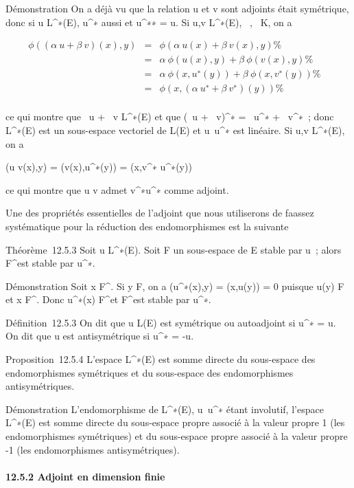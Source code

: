 \documentclass[]{article}
\begin{document}
Démonstration On a déjà vu que la relation u et v sont adjoints était
symétrique, donc si u \in L^∗(E), u^∗ aussi et
u^∗∗ = u. Si u,v \in L^∗(E), \alpha~,\beta~ \in K, on a

\begin{align*} \phi((\alpha~u + \beta~v)(x),y)& =& \phi(\alpha~u(x) +
\beta~v(x),y) \%& \\ & =& \alpha~\phi(u(x),y) +
\beta~\phi(v(x),y) \%& \\ & =&
\alpha~\phi(x,u^∗(y)) + \beta~\phi(x,v^∗(y))\%&
\\ & =& \phi(x,(\alpha~u^∗ +
\beta~v^∗)(y)) \%& \\
\end{align*}

ce qui montre que \alpha~u + \beta~v \in L^∗(E) et que (\alpha~u +
\beta~v)^∗ = \alpha~u^∗ + \beta~v^∗~; donc
L^∗(E) est un sous-espace vectoriel de L(E) et
u\mapsto~u^∗ est linéaire. Si u,v \in
L^∗(E), on a

\phi(u \cdot v(x),y) = \phi(v(x),u^∗(y)) = \phi(x,v^∗\cdot
u^∗(y))

ce qui montre que u \cdot v admet v^∗\cdot u^∗ comme
adjoint.

Une des propriétés essentielles de l'adjoint que nous utiliserons de
fa\ccon assez systématique pour la réduction des
endomorphismes est la suivante

Théorème~12.5.3 Soit u \in L^∗(E). Soit F un sous-espace de E
stable par u~; alors F^\bot est stable par u^∗.

Démonstration Soit x \in F^\bot. Si y \in F, on a
\phi(u^∗(x),y) = \phi(x,u(y)) = 0 puisque u(y) \in F et x \in
F^\bot. Donc u^∗(x) \in F^\bot et
F^\bot est stable par u^∗.

Définition~12.5.3 On dit que u \in L(E) est symétrique ou autoadjoint si
u^∗ = u. On dit que u est antisymétrique si u^∗ =
-u.

Proposition~12.5.4 L'espace L^∗(E) est somme directe du
sous-espace des endomorphismes symétriques et du sous-espace des
endomorphismes antisymétriques.

Démonstration L'endomorphisme de L^∗(E),
u\mapsto~u^∗ étant involutif, l'espace
L^∗(E) est somme directe du sous-espace propre associé à la
valeur propre 1 (les endomorphismes symétriques) et du sous-espace
propre associé à la valeur propre -1 (les endomorphismes
antisymétriques).

\paragraph{12.5.2 Adjoint en dimension finie}
\end{document}
